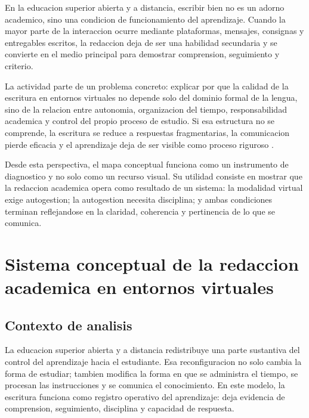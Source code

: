 \documentclass[
	spanish,
	letterpaper, oneside
]{article}
\begin{document}
En la educacion superior abierta y a distancia, escribir bien no es un adorno academico, sino una condicion de funcionamiento del aprendizaje. Cuando la mayor parte de la interaccion ocurre mediante plataformas, mensajes, consignas y entregables escritos, la redaccion deja de ser una habilidad secundaria y se convierte en el medio principal para demostrar comprension, seguimiento y criterio.

La actividad parte de un problema concreto: explicar por que la calidad de la escritura en entornos virtuales no depende solo del dominio formal de la lengua, sino de la relacion entre autonomia, organizacion del tiempo, responsabilidad academica y control del propio proceso de estudio. Si esa estructura no se comprende, la escritura se reduce a respuestas fragmentarias, la comunicacion pierde eficacia y el aprendizaje deja de ser visible como proceso riguroso \citep{correaManualBasicoEscritura2018,nunezcortesEscrituraAcademicaTeoria2015}.

Desde esta perspectiva, el mapa conceptual funciona como un instrumento de diagnostico y no solo como un recurso visual. Su utilidad consiste en mostrar que la redaccion academica opera como resultado de un sistema: la modalidad virtual exige autogestion; la autogestion necesita disciplina; y ambas condiciones terminan reflejandose en la claridad, coherencia y pertinencia de lo que se comunica.

\section{Sistema conceptual de la redaccion academica en entornos virtuales}

\subsection{Contexto de analisis}

La educacion superior abierta y a distancia redistribuye una parte sustantiva del control del aprendizaje hacia el estudiante. Esa reconfiguracion no solo cambia la forma de estudiar; tambien modifica la forma en que se administra el tiempo, se procesan las instrucciones y se comunica el conocimiento. En este modelo, la escritura funciona como registro operativo del aprendizaje: deja evidencia de comprension, seguimiento, disciplina y capacidad de respuesta.
\end{document}
